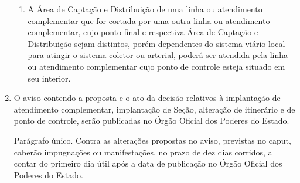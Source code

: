 \begin{enumerate}[resume, label=Art. \arabic*]
\begin{enumerate}[label= \S \arabic*]
\item A Área de Captação e Distribuição de uma linha ou atendimento complementar que for cortada por uma outra linha ou atendimento complementar, cujo ponto final e respectiva Área de Captação e Distribuição sejam distintos, porém dependentes do sistema viário local para atingir o sistema coletor ou arterial, poderá ser atendida pela linha ou atendimento complementar cujo ponto de controle esteja situado em seu interior.

\end{enumerate}

\item O aviso contendo a proposta e o ato da decisão relativos à implantação de atendimento complementar, implantação de Seção, alteração de itinerário e de ponto de controle, serão publicadas no Órgão Oficial dos Poderes do Estado.

Parágrafo único. Contra as alterações propostas no aviso, previstas no caput, caberão impugnações ou manifestações, no prazo de dez dias corridos, a contar do primeiro dia útil após a data de publicação no Órgão Oficial dos Poderes do Estado.


\end{enumerate}








